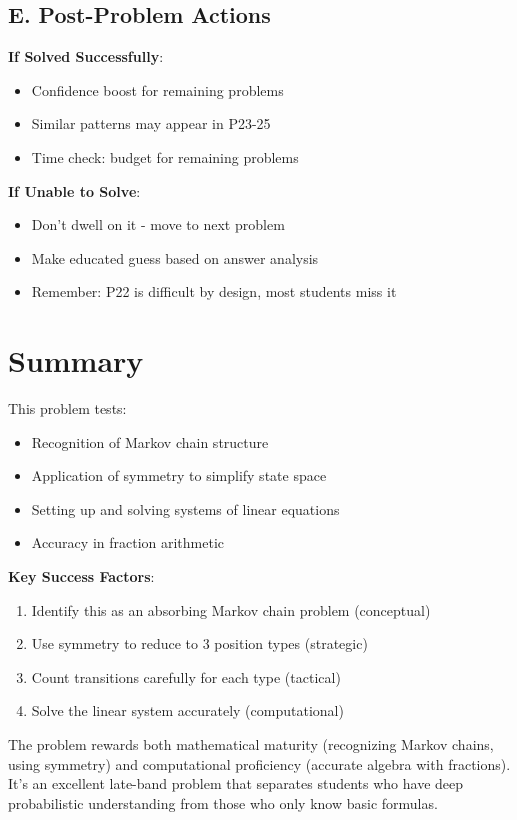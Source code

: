 \documentclass[12pt]{article}
\begin{document}
\begin{competitionbox}
\subsection*{E. Post-Problem Actions}

\textbf{If Solved Successfully}:
\begin{itemize}[leftmargin=*]
    \item Confidence boost for remaining problems
    \item Similar patterns may appear in P23-25
    \item Time check: budget for remaining problems
\end{itemize}

\textbf{If Unable to Solve}:
\begin{itemize}[leftmargin=*]
    \item Don't dwell on it - move to next problem
    \item Make educated guess based on answer analysis
    \item Remember: P22 is difficult by design, most students miss it
\end{itemize}

\end{competitionbox}

\section*{Summary}

This problem tests:
\begin{itemize}
    \item Recognition of Markov chain structure
    \item Application of symmetry to simplify state space
    \item Setting up and solving systems of linear equations
    \item Accuracy in fraction arithmetic
\end{itemize}

\textbf{Key Success Factors}:
\begin{enumerate}
    \item Identify this as an absorbing Markov chain problem (conceptual)
    \item Use symmetry to reduce to 3 position types (strategic)
    \item Count transitions carefully for each type (tactical)
    \item Solve the linear system accurately (computational)
\end{enumerate}

The problem rewards both mathematical maturity (recognizing Markov chains, using symmetry) and computational proficiency (accurate algebra with fractions). It's an excellent late-band problem that separates students who have deep probabilistic understanding from those who only know basic formulas.
\end{document}
